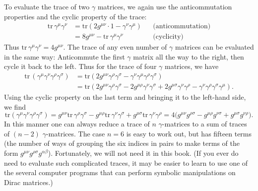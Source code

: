 To evaluate the trace of two $\gamma$ matrices, we again use the
anticommutation properties and the cyclic property of the trace:
\begin{equation}
  \begin{aligned}
    \mathrm{tr}\,\gamma^\mu\gamma^\nu
      &= \mathrm{tr}(2g^{\mu\nu}\cdot 1 - \gamma^\nu\gamma^\mu)
      &&\text{(anticommutation)}\\
    &= 8g^{\mu\nu} - \mathrm{tr}\,\gamma^\mu\gamma^\nu
      &&\text{(cyclicity)}
  \end{aligned}
\end{equation}
Thus $\mathrm{tr}\,\gamma^\mu\gamma^\nu = 4g^{\mu\nu}$.  The trace of any even
number of $\gamma$ matrices can be evaluated in the same way: Anticommute the
first $\gamma$ matrix all the way to the right, then cycle it back to the
left.  Thus for the trace of four $\gamma$ matrices, we have
\begin{equation}
  \begin{aligned}
    \mathrm{tr}\,(\gamma^\mu\gamma^\nu\gamma^\rho\gamma^\sigma)
    &= \mathrm{tr}(2g^{\mu\nu}\gamma^\rho\gamma^\sigma
      - \gamma^\nu\gamma^\mu\gamma^\rho\gamma^\sigma)\\
    &= \mathrm{tr}(2g^{\mu\nu}\gamma^\rho\gamma^\sigma
      - 2g^{\mu\rho}\gamma^\nu\gamma^\sigma
      + 2g^{\mu\sigma}\gamma^\nu\gamma^\rho
      - \gamma^\nu\gamma^\rho\gamma^\sigma\gamma^\mu) .
  \end{aligned}
\end{equation}
Using the cyclic property on the last term and bringing it to the left-hand
side, we find
\begin{equation}
  \mathrm{tr}(\gamma^\mu\gamma^\nu\gamma^\rho\gamma^\sigma)
    = g^{\mu\nu}\mathrm{tr}\,\gamma^\rho\gamma^\sigma
      - g^{\mu\rho}\mathrm{tr}\,\gamma^\nu\gamma^\sigma
      + g^{\mu\sigma}\mathrm{tr}\,\gamma^\nu\gamma^\rho
    = 4\bigl( g^{\mu\nu}g^{\rho\sigma} - g^{\mu\rho}g^{\nu\sigma}
      + g^{\mu\sigma}g^{\nu\rho} \bigr) .
\end{equation}
In this manner one can always reduce a trace of $n$ $\gamma$-matrices to a sum
of traces of $(n-2)$ $\gamma$-matrices.  The case $n=6$ is easy to work out,
but has fifteen terms (the number of ways of grouping the six indices in pairs
to make terms of the form $g^{\mu\nu}g^{\rho\sigma}g^{\alpha\beta}$).
Fortunately, we will not need it in this book.  (If you ever do need to
evaluate such complicated traces, it may be easier to learn to use one of the
several computer programs that can perform symbolic manipulations on Dirac
matrices.)

